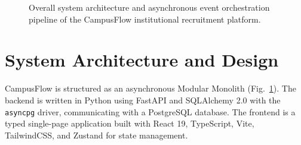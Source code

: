 \documentclass[conference]{IEEEtran}
\begin{document}
\begin{figure}[t]
{
}
\caption{Overall system architecture and asynchronous event orchestration pipeline of the CampusFlow institutional recruitment platform.}
\label{fig:arch}
\end{figure}

\section{System Architecture and Design}

CampusFlow is structured as an asynchronous Modular Monolith (Fig.~\ref{fig:arch}). The backend is written in Python using FastAPI and SQLAlchemy 2.0 with the \texttt{asyncpg} driver, communicating with a PostgreSQL database. The frontend is a typed single-page application built with React 19, TypeScript, Vite, TailwindCSS, and Zustand for state management.
\end{document}
